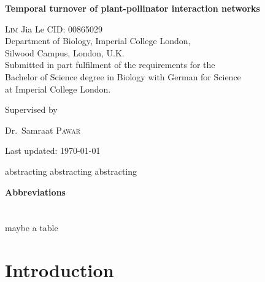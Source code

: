 \documentclass[11pt]{article}
\renewenvironment{abstract}
 {\hspace{.8cm}
  {\bfseries\huge\abstractname}
  \list{}{
    \setlength{\leftmargin}{.95cm}%
    \setlength{\rightmargin}{\leftmargin}%
  }%
  \item\relax}
 {\endlist}
\begin{document}
\begin{titlepage}
	\centering
	\vspace*{\fill}
	{\huge\bfseries Temporal turnover of plant-pollinator interaction networks \par}
	\vspace{2cm}
	{\Large \textsc{Lim} Jia Le  {    }  CID: 00865029}
	\\ 	\vspace{0.5cm}
	{Department of Biology, Imperial College London, \\Silwood Campus, London, U.K.} \\ \vspace{0.5cm}
	{Submitted in part fulfilment of the requirements for the \\ Bachelor of Science degree in Biology with German for Science \\ at Imperial College London.} \\
	\vspace*{\fill}
	{\large Supervised by\par
	Dr.~Samraat \textsc{Pawar}}
	\vfill
	{\large Last updated: \today\par}
\end{titlepage}

\newpage
{}
\vspace*{\fill}
\begin{abstract}  
\doublespacing
abstracting abstracting abstracting

\end{abstract}
\vfill

\newpage
{}
\vspace*{\fill}
\tableofcontents 
\vspace*{\fill} 
\thispagestyle{empty}

\doublespacing

\newpage 
\vspace*{\fill}
{\huge\bfseries Abbreviations} \\
\\
\\
\large{maybe a table}
\vfill

\newpage
\pagestyle{fancy}
\fancyhf{}
\renewcommand{\headrulewidth}{0pt}

\section{Introduction} %
\end{document}
